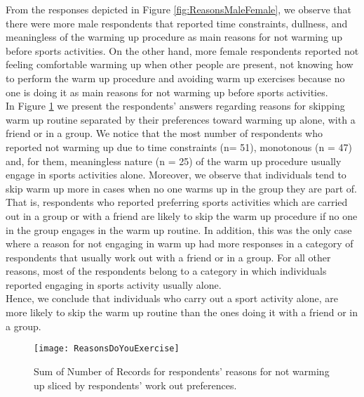 From the responses depicted in Figure \ref{fig:ReasonsMaleFemale}, we observe that there were more male respondents that reported time constraints, dullness, and meaningless of the warming up procedure as main reasons for not warming up before sports activities. On the other hand, more female respondents reported not feeling comfortable warming up when other people are present, not knowing how to perform the warm up procedure and avoiding warm up exercises because no one is doing it as main reasons for not warming up before sports activities. \\In Figure  \ref{fig:ReasonsDoYouExercise} we present the respondents' answers regarding reasons for skipping warm up routine separated by their preferences toward warming up alone, with a friend or in a group. We notice that the most number of respondents who reported not warming up due to time constraints (n= 51), monotonous (n = 47) and, for them, meaningless nature (n = 25) of the warm up procedure usually engage in sports activities alone. Moreover, we observe that individuals tend to skip warm up more in cases when no one warms up in the group they are part of. That is, respondents who reported preferring sports activities which are carried out in a group or with a friend are likely to skip the warm up procedure if no one in the group engages in the warm up routine. In addition, this was the only case where a reason for not engaging in warm up had more responses in a category of respondents that usually work out with a friend or in a group. For all other reasons, most of the respondents belong to a category in which individuals reported engaging in sports activity usually alone. \\Hence, we conclude that individuals who carry out a sport activity alone, are more likely to skip the warm up routine than the ones doing it with a friend or in a group.\\
\begin{figure}[h]
    \centering
    \texttt{[image: ReasonsDoYouExercise]}
    \caption{Sum of Number of Records for respondents' reasons for not warming up sliced by respondents' work out preferences.}
    \label{fig:ReasonsDoYouExercise}
\end{figure}\\
